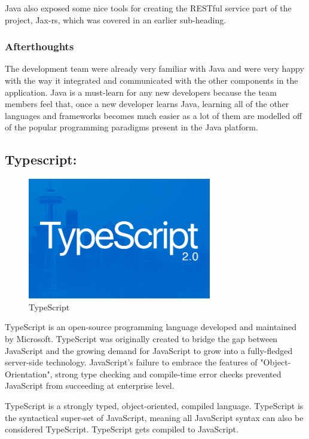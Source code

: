 Java also exposed some nice tools for creating the RESTful service part of the project, Jax-rs, which was covered in an earlier sub-heading. 

\subsubsection{Afterthoughts}
The development team were already very familiar with Java and were very happy with the way it integrated and communicated with the other components in the application. Java is a must-learn for any new developers because the team members feel that, once a new developer learns Java, learning all of the other languages and frameworks becomes much easier as a lot of them are modelled off of the popular programming paradigms present in the Java platform. 



\subsection{Typescript:}
\label{sec:TechnologyReviewTypescript}

\begin{figure}[H]
    \centering
    \includegraphics[width=\textwidth, height=150pt]{img/TypeScriptLogo.PNG}
    \caption{TypeScript}
    \label{fig:my_label}
\end{figure}

\bigskip

TypeScript is an open-source programming language developed and maintained by Microsoft. TypeScript was originally created to bridge the gap between JavaScript and the growing demand for JavaScript to grow into a fully-fledged server-side technology. JavaScript's failure to embrace the features of "Object-Orientation", strong type checking and compile-time error checks prevented JavaScript from succeeding at enterprise level. 

TypeScript is a strongly typed, object-oriented, compiled language. TypeScript is the syntactical super-set of JavaScript, meaning all JavaScript syntax can also be considered TypeScript. TypeScript gets compiled to JavaScript. 

